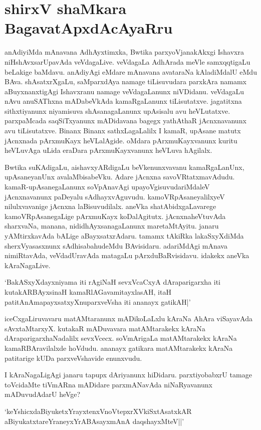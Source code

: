\chapter{shirxV shaMkara BagavatApxdAcAyaRru}\label{chap3}

anAdiyiMda mAnavana AdhAyxtimxka, Bwtika parxyoVjanakAkxgi Ishavxra niHshAvxsarUpavAda veVdagaLive. veVdagaLa AdhArada meVle samxqqtigaLu beLakige baMdavu. anAdiyAgi eMdare mAnavana avataraNa kAladiMdalU eMdu BAva. shAsatxrXgaLu, saMparxdAya namage tiLisuvudara parxkAra namamx aBuyxnanxtigAgi Ishavxranu namage veVdagaLanunx niVDidanu. veVdagaLu nAvu anuSAThxna mADabeVkAda kamaRgaLanunx tiLisutatxve. jagatitxna sithxtiyanunx niyamisuva shAsanagaLanunx upAsisalu avu heVLutatxve. parxpaMcada saqSiTxyanunx mADidavana bagegx yathAthaR jAcnxnavanunx avu tiLisutatxve. Binanx Binanx sathxLagaLalilx I kamaR, upAsane matutx jAcnxnada pArxmuKayx heVLalAgide. oMdara pArxmuKayxvanunx kuritu heVLuvAga uLida eraDara pArxmuKayxvanunx heVLuva hAgilalx.

Bwtika suKAdigaLu, aishavxyARdigaLu beVkenunxvavanu kamaRgaLanUnx, upAsaneyanUnx avalaMbisabeVku. Adare jAcnxna savoVRtatxmavAdudu. kamaR-upAsanegaLanunx soVpAnavAgi upayoVgisuvudariMdaleV jAcnxnavanunx paDeyalu sAdhayxvAguvudu. kamoVRpAsaneyalilxyeV nilulxvavanige jAcnxna laBisuvudilalx. aneVka shatAbidxgaLavarege kamoVRpAsanegaLige pArxmuKayx koDalAgitutx. jAcnxnaheVtuvAda sharxvaNa, manana, nididhAyxsanagaLanunx maretaMtAyitu. janaru yAMtirxkavAda bALige aBayxsatxrAdaru. tamamx tAkiRka lakaSxyXdiMda sherxVyasasxnunx sAdhisabahudeMdu BAvisidaru. adariMdAgi mAnava nimiRtavAda, veVdadUravAda matagaLu pArxduBaRvisidavu. idakekx aneVka kAraNagaLive.

`BakASxyXdayxniyama iti rAgiNaH sevxVcaCxyA dAraparigarxha iti kutakARBAyxsinaH kamaRlAGavamitayxlasAH, itaH patitAnAmapayxsatxyXnuparxveVsha iti ananayx gatikAH|'

iceCxgaLiruvavaru matAMtaranunx mADikoLaLxlu kAraNa AhAra viSayavAda sAvxtaMtarxyX. kutakaR mADuvavara matAMtarakekx kAraNa dAraparigarxhaNadalilx sevxVcecx. soVmArigaLa matAMtarakekx kAraNa kamaRBAravilalxde hoVdudu. ananayx gatikara matAMtarakekx kAraNa patitarige kUDa parxveVshavide enunxvudu.

I kAraNagaLigAgi janaru tapupx dAriyanunx hiDidaru. parxtiyobabxrU tamage toVcidaMte tiVmARna mADidare parxmANavAda niNaRyavanunx mADuvudAdarU heVge?

\begin{shloka}
`keYshicxdaBiyuketxYrayxtenxVnoVtepxrXVkiSxtAsatxkAR\\
aBiyukatxtareYraneyxYrABAsayxmAnA daqshayxMteV||'
\end{shloka}

